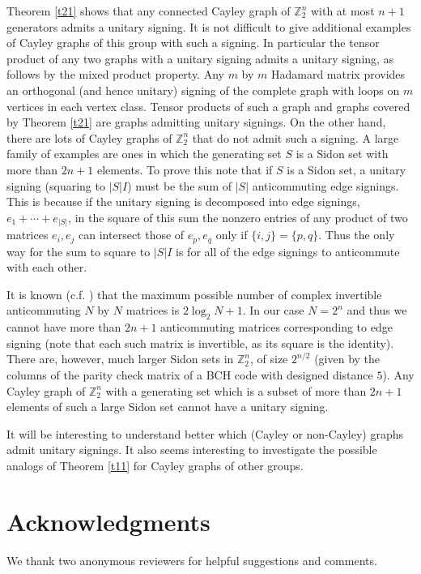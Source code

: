 Theorem \ref{t21} shows that any connected Cayley graph of 
${\mathbb{Z}_{2}^{n}}$ with at most $n+1$ generators admits a unitary signing. 
It is not difficult to give additional examples of
Cayley graphs of this group with such a signing. In particular
the tensor product of any two graphs with a unitary signing
admits a unitary signing, as follows by the mixed product property.
Any $m$ by $m$ Hadamard matrix provides an orthogonal (and hence
unitary) signing of the complete graph with loops on $m$ vertices
in each vertex class. Tensor products of such a graph and graphs
covered by Theorem \ref{t21} are graphs admitting unitary
signings. On the other hand, there are lots of Cayley graphs of
${\mathbb{Z}_{2}^{n}}$ that do not admit  such a signing. A large family of examples
are ones in which the generating set $S$ is a Sidon set with more
than  $2n+1$ elements. To prove this note that if
$S$ is a Sidon set, a unitary signing (squaring to $|S|I$) must
be the sum of $|S|$ anticommuting edge signings. This is because
if the unitary signing is 
decomposed into edge
signings, $e_1 + \cdots + e_{|S|}$, in the square of this sum
the nonzero entries of any product of two matrices  $e_i,e_j$
can intersect those of $e_p,e_q$ only if $\{i,j\}=\{p,q\}$. Thus
the only way for the sum to square to $|S|I$ is for
all of the edge signings to anticommute with each other.

It is known (c.f. \cite{Hr}) that the maximum possible number of complex
invertible anticommuting $N$ by $N$  matrices is
$2 \log_2 N+1$. In our case $N=2^n$ and thus we cannot have more than
$2n+1$ anticommuting matrices corresponding to edge signing (note that
each such matrix is invertible, as its square is the identity).
There are, however, much larger Sidon sets in ${\mathbb{Z}_{2}^{n}}$, 
of size $2^{n/2}$
(given by the columns of the parity check matrix of a BCH code with designed
distance $5$). Any Cayley graph of ${\mathbb{Z}_{2}^{n}}$ with a generating set which is a 
subset of more than $2n+1$ elements of such a large Sidon set cannot have
a unitary signing.

It will be interesting to understand better which (Cayley or non-Cayley) 
graphs admit unitary signings. It also seems interesting to investigate
the possible analogs of Theorem \ref{t11} for Cayley graphs of other groups.


\section*{Acknowledgments} %
We thank two anonymous reviewers for helpful suggestions
and comments.


